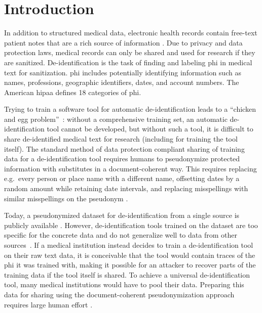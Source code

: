
\section{Introduction}\label{sec:introduction}
%
In addition to structured medical data, electronic health records contain free-text patient notes that are a rich source of information \citep{jensen2012mining}.
%
Due to privacy and data protection laws, medical records can only be shared and used for research if they are sanitized.
%
De-identification is the task of finding and labeling \ac{phi} in medical text for sanitization.
%
\Ac{phi} includes potentially identifying information such as names, professions, geographic identifiers, dates, and account numbers.
%
The American \ac{hipaa} defines 18 categories of \ac{phi}.



%
Trying to train a software tool for automatic de-identification leads to a ``chicken and egg problem''~\citep{uzuner2007evaluating}: without a comprehensive training set, an automatic de-identification tool cannot be developed, but without such a tool, it is difficult to share de-identified medical text for research (including for training the tool itself).
%
The standard method of data protection compliant sharing of training data for a de-identification tool requires humans to pseudonymize protected information with substitutes in a document-coherent way.
%
This requires replacing e.g.\ every person or place name with a different name, offsetting dates by a random amount while retaining date intervals, and replacing misspellings with similar misspellings on the pseudonym \cite{uzuner2007evaluating}.

%
Today, a pseudonymized dataset for de-identification from a single source is publicly available \citep{stubbs2015annotating}.
%
However, de-identification tools trained on the dataset are too specific for the concrete data and do not generalize well to data from other sources~\citep{stubbs2017identification}.
%
If a medical institution instead decides to train a de-identification tool on their raw text data, it is conceivable that the tool would contain traces of the \ac{phi} it was trained with, making it possible for an attacker to recover parts of the training data if the tool itself is shared.
%
To achieve a universal de-identification tool, many medical institutions would have to pool their data.
%
Preparing this data for sharing using the document-coherent pseudonymization approach requires large human effort \citep{dernoncourt2017identification}.

